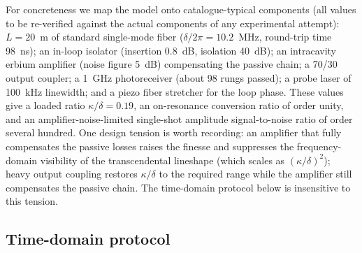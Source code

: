 \documentclass[11pt,a4paper]{article}
\begin{document}
For concreteness we map the model onto catalogue-typical components (all values
to be re-verified against the actual components of any experimental attempt):
$L = 20$~m of standard single-mode fiber ($\delta / 2\pi = 10.2$~MHz,
round-trip time 98~ns); an in-loop isolator (insertion 0.8~dB, isolation
40~dB); an intracavity erbium amplifier (noise figure 5~dB) compensating the
passive chain; a 70/30 output coupler; a 1~GHz photoreceiver (about 98 rungs
passed); a probe laser of 100~kHz linewidth; and a piezo fiber stretcher for
the loop phase. These values give a loaded ratio $\kappa/\delta = 0.19$, an
on-resonance conversion ratio of order unity, and an amplifier-noise-limited
single-shot amplitude signal-to-noise ratio of order several hundred. One
design tension is worth recording: an amplifier that fully compensates the
passive losses raises the finesse and suppresses the frequency-domain
visibility of the transcendental lineshape (which scales as
$(\kappa/\delta)^2$); heavy output coupling restores $\kappa/\delta$ to the
required range while the amplifier still compensates the passive chain. The
time-domain protocol below is insensitive to this tension.

\subsection{Time-domain protocol}
\label{sec:protocol}
\end{document}
